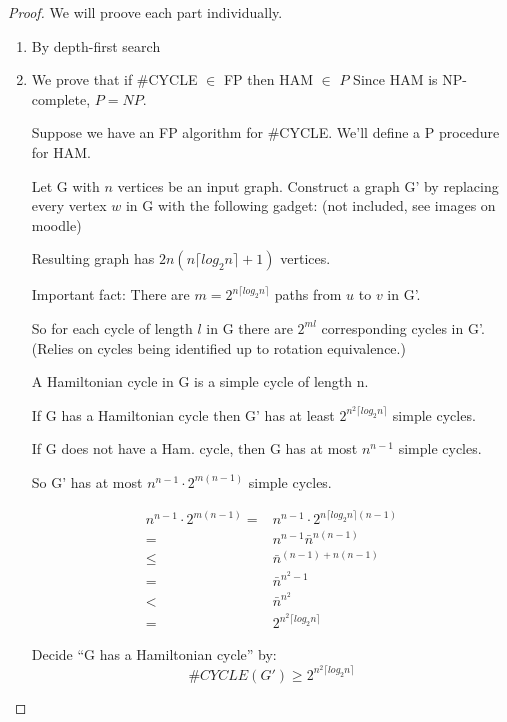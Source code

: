 \documentclass[a4paper,12pt]{article}
\theoremstyle{definition}
\theoremstyle{remark}
\begin{document}
\begin{proof}
    We will proove each part individually.
    \begin{enumerate}
        \item By depth-first search
        \item We prove that if $\#$CYCLE $\in$ FP then HAM $\in$ $P$
        Since HAM is NP-complete, $P = NP$.

        Suppose we have an FP algorithm for $\#$CYCLE. We'll define a P procedure for HAM.

        Let G with $n$ vertices be an input graph. Construct a graph G' by replacing every vertex $w$ in G with the following gadget: (not included, see images on moodle)


        Resulting graph has $2n(n \lceil log_2 n \rceil + 1)$ vertices.

        Important fact: There are $m = 2^{n \lceil log_2 n \rceil}$ paths from $u$ to $v$ in G'.

        So for each cycle of length $l$ in G there are $2^{ml}$ corresponding cycles in G'.
        (Relies on cycles being identified up to rotation equivalence.) 

        A Hamiltonian cycle in G is a simple cycle of length n.

        If G has a Hamiltonian cycle then G' has at least $2^{n^2 \lceil log_2 n \rceil}$ simple cycles.

        If G does not have a Ham. cycle, then G has at most $n^{n-1}$ simple cycles.

        So G' has at most $n^{n-1} \cdot 2^{m (n-1)}$ simple cycles.

        \begin{align*}
            n^{n-1} \cdot 2^{m (n-1)} =& n^{n-1} \cdot 2^{n \lceil log_2 n \rceil (n-1)} \\
                                      =& n^{n-1} \bar{n}^{n (n - 1)} \\
                                      \leq& \bar{n}^{(n-1) + n (n-1)} \\
                                      =& \bar{n}^{n^2 - 1} \\
                                      <& \bar{n}^{n^2} \\
                                      =& 2^{n^2 \lceil log_2 n \rceil} 
        \end{align*}

        Decide ``G has a Hamiltonian cycle'' by:
        \begin{equation*}
            \#CYCLE(G') \geq 2^{n^2 \lceil log_2 n \rceil} 
        \end{equation*}
    \end{enumerate}
\end{proof}
\end{document}
